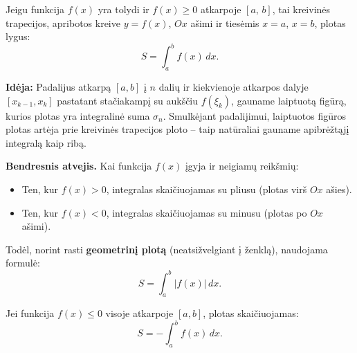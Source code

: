 \begin{theorem}
Jeigu funkcija $f(x)$ yra tolydi ir $f(x) \geq 0$ atkarpoje $[a,\,b]$, tai kreivinės trapecijos, 
apribotos kreive $y = f(x)$, $Ox$ ašimi ir tiesėmis $x = a$, $x = b$, plotas lygus:
\[
S = \int_a^b f(x)\,dx.
\]
\end{theorem}

\textbf{Idėja:} Padalijus atkarpą $[a,b]$ į $n$ dalių ir kiekvienoje atkarpos dalyje 
$[x_{k-1}, x_k]$ pastatant stačiakampį su aukščiu $f(\xi_k)$, gauname laiptuotą figūrą, 
kurios plotas yra integralinė suma $\sigma_n$. Smulkėjant padalijimui, laiptuotos figūros plotas 
artėja prie kreivinės trapecijos ploto – taip natūraliai gauname apibrėžtąjį integralą kaip ribą.

\begin{center}
\end{center}

\textbf{Bendresnis atvejis.} Kai funkcija $f(x)$ įgyja ir neigiamų reikšmių:
\begin{itemize}
    \item Ten, kur $f(x) > 0$, integralas skaičiuojamas su pliusu (plotas virš $Ox$ ašies).
    \item Ten, kur $f(x) < 0$, integralas skaičiuojamas su minusu (plotas po $Ox$ ašimi).
\end{itemize}

Todėl, norint rasti \textbf{geometrinį plotą} (neatsižvelgiant į ženklą), naudojama formulė:
\[
S = \int_a^b |f(x)|\,dx.
\]

Jei funkcija $f(x) \leq 0$ visoje atkarpoje $[a,b]$, plotas skaičiuojamas:
\[
S = -\int_a^b f(x)\,dx.
\]

